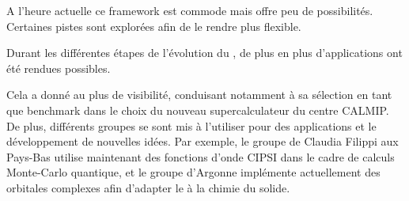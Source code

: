 \documentclass[./thesis.tex]{subfiles}
\begin{document}
A l'heure actuelle ce framework est commode mais offre peu de possibilités. Certaines pistes sont explorées afin de le rendre plus flexible.

Durant les différentes étapes de l'évolution du \QP, de plus en plus d'applications ont été rendues possibles.\cite{Loos_2018,Garniron_2018,Giner_2017,Garniron_2017,Garniron_2017b,Scemama_2018,1806.05115}

Cela a donné au \QP plus de visibilité, conduisant notamment à sa sélection en tant que benchmark dans le choix du nouveau supercalculateur du centre CALMIP. De plus, différents groupes se sont mis à l'utiliser pour des applications et le développement de nouvelles idées. Par exemple, le groupe de Claudia Filippi aux Pays-Bas utilise maintenant des fonctions d'onde CIPSI dans le cadre de calculs Monte-Carlo quantique,\cite{Dash_2018} et le groupe d'Argonne implémente actuellement des orbitales complexes afin d'adapter le \QP à la chimie du solide.\cite{Benali_2018}
\end{document}
